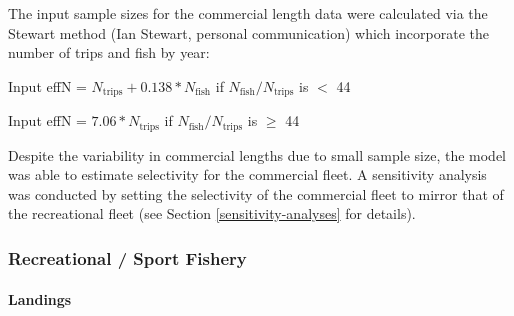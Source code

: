 \documentclass[11pt,
  english,
  a4paper,
]{article}
\begin{document}
\leavevmode\tagmcend\tagstructend\par


The input sample sizes for the commercial length data were calculated via the Stewart method (Ian Stewart, personal communication) which incorporate the number of trips and fish by year:

\leavevmode\tagmcend\tagstructend\par

\begin{centering}

Input effN = $N_{\text{trips}} + 0.138 * N_{\text{fish}}$ if $N_{\text{fish}}/N_{\text{trips}}$ is $<$ 44

Input effN = $7.06 * N_{\text{trips}}$ if $N_{\text{fish}}/N_{\text{trips}}$ is $\geq$ 44

\end{centering}


Despite the variability in commercial lengths due to small sample size, the model was able to estimate selectivity for the commercial fleet. A sensitivity analysis was conducted by setting the selectivity of the commercial fleet to mirror that of the recreational fleet (see Section \ref{sensitivity-analyses} for details).

\leavevmode\tagmcend\tagstructend\par


\hypertarget{recreational-sport-fishery}{%
\subsubsection{Recreational / Sport Fishery}\label{recreational-sport-fishery}}

\leavevmode\tagmcend\tagstructend


\hypertarget{landings-1}{%
\paragraph{Landings}\label{landings-1}}

\leavevmode\tagmcend\tagstructend

\end{document}
